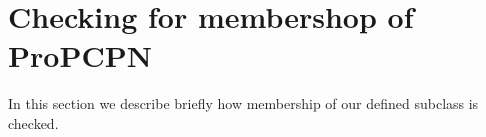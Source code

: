 \section{Checking for membershop of ProPCPN}
In this section we describe briefly how membership of our defined subclass is checked.
